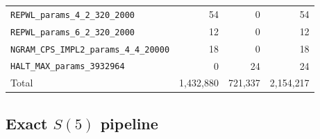 \documentclass[letterpaper,british,11pt]{article}
\theoremstyle{definition} %
\numberwithin{equation}{section}
\theoremstyle{definition} %
\begin{document}
\begin{table}[h!]
\begin{tabular}{|lrrr|}
        \texttt{REPWL\_params\_4\_2\_320\_2000}           & 54            & 0         & 54            \\
        \texttt{REPWL\_params\_6\_2\_320\_2000}           & 12            & 0         & 12            \\
        \texttt{NGRAM\_CPS\_IMPL2\_params\_4\_4\_20000}   & 18            & 0         & 18            \\
        \texttt{HALT\_MAX\_params\_3932964}               & 0             & 24        & 24            \\
        \hline
        Total                                             & 1{,}432{,}880 & 721{,}337 & 2{,}154{,}217 \\
        \hline
    \end{tabular}
\end{table}

\subsection{Exact $S(5)$ pipeline}\label{app:pipeS5exact}
\end{document}
